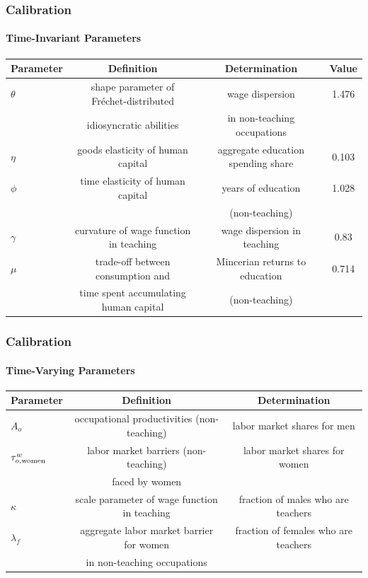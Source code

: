 \documentclass[11pt]{beamer}
\begin{document}
\begin{frame}
	\frametitle{Calibration}
	\framesubtitle{Time-Invariant Parameters}
 \label{invar}
	\tiny
	\begin{table}[h!]
		\centering
		\begin{tabular}{lccc}
			\toprule
			Parameter & Definition & Determination & Value\\
			\midrule
			$\theta$ & shape parameter of Fr\'echet-distributed & wage dispersion & 1.476\\
			& idiosyncratic abilities & in non-teaching occupations &\\
			$\eta$ & goods elasticity of human capital & aggregate education spending share  & 0.103\\
			$\phi$ & time elasticity of human capital & years of education  & 1.028\\
            &  & (non-teaching) &\\
			$\gamma$ & curvature of wage function in teaching & wage dispersion in teaching & 0.83\\
			$\mu$ &  trade-off between consumption and & Mincerian returns to education & 0.714\\
			& time spent accumulating human capital & (non-teaching) & \\
			\bottomrule
		\end{tabular}
		\label{tab:param}
	\end{table}
 \hyperlink{calib}{}
\end{frame}

\begin{frame}
	\frametitle{Calibration}
	\framesubtitle{Time-Varying Parameters}
  \label{var}
	\tiny
	\begin{table}[h!]
		\centering
		\begin{tabular}{lcc}
			\toprule
			Parameter & Definition & Determination \\
			\midrule			
			$A_{o}$ & occupational productivities (non-teaching) & labor market shares for men  \\
			$\tau^{w}_{o,{\rm women}}$ & labor market barriers (non-teaching) & labor market shares for women \\
			& faced by women & \\
			$\kappa$ & scale parameter of wage function in teaching & fraction of males who are teachers \\
			$\lambda_f$ & aggregate labor market barrier for women & fraction of females who are teachers \\
			& in non-teaching occupations & \\
			\bottomrule
		\end{tabular}
		\label{tab:param_time}
	\end{table}
 \hyperlink{calib}{}
\end{frame}
\end{document}
